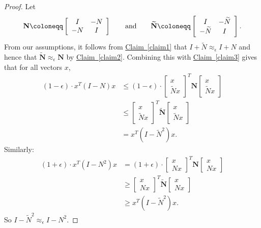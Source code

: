 \documentclass[11pt]{article}
\numberwithin{equation}{section}
\theoremstyle{definition}
\theoremstyle{plain}
\newcommand{\expref}[2]{\hyperref[#2]{#1~\ref{#2}}}
\newcommand{\wt}{\widetilde}   %
\numberwithin{myalgctr}{section}
\theoremstyle{named}
\begin{document}
\begin{proof}
Let 
\[
\mathbf{N}\coloneqq \left[
\begin{array}{c c}
I & -N \\
-N & I
\end{array}
\right] 
\qquad
\text{and}
\qquad
\wt{\mathbf{N}}\coloneqq \left[
\begin{array}{c c}
I & -\wt{N} \\
-\wt{N} & I
\end{array}
\right] .
\]
{}From our assumptions, it follows from \expref{Claim}{claim1} that $I+\wt{N}\approx_{\epsilon}I+N$ and hence that $\wt{\mathbf{N}}\approx_{\epsilon}\mathbf{N}$ by \expref{Claim}{claim2}. Combining this with \expref{Claim}{claim3} gives that for all vectors $x$,
\begin{align*}
(1-\epsilon)\cdot x^T(I-N)x&\leq (1-\epsilon)\cdot \left[
\begin{array}{c}
x \\
\wt{N}x
\end{array}\right]^{T}\mathbf{N}\left[
\begin{array}{c}
x \\
\wt{N}x
\end{array}\right]\\
&\leq \left[
\begin{array}{c}
x \\
\wt{N}x
\end{array}\right]^{T}\wt{\mathbf{N}}\left[
\begin{array}{c}
x \\
\wt{N}x
\end{array}\right]\\
&=x^{T}(I-\wt{N}^2)x.
\end{align*}
Similarly:
\begin{align*}
(1+\epsilon)\cdot x^T(I-N^2)x&= (1+\epsilon)\cdot \left[
\begin{array}{c}
x \\
Nx
\end{array}\right]^{T}\mathbf{N}\left[
\begin{array}{c}
x \\
Nx
\end{array}\right]\\
&\geq \left[
\begin{array}{c}
x \\
Nx
\end{array}\right]^{T}\wt{\mathbf{N}}\left[
\begin{array}{c}
x \\
Nx
\end{array}\right]\\
&\geq x^{T}(I-\wt{N}^2)x.
\end{align*}
So $I-\wt{N}^2\approx_{\epsilon}I-N^{2}$.
\end{proof}
\end{document}

